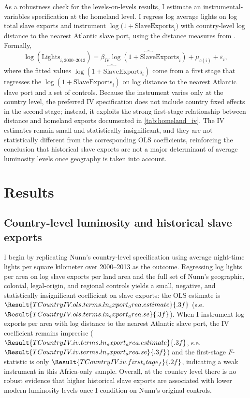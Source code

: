 \documentclass[12pt]{article}
\begin{document}
As a robustness check for the levels-on-levels results, I estimate an instrumental-variables specification at the homeland level. I regress log average lights on log total slave exports and instrument $\log\bigl(1+\text{SlaveExports}_i\bigr)$ with country-level log distance to the nearest Atlantic slave port, using the distance measures from \citet{nunn2008}. Formally,
\begin{equation}
\log\!\left(\text{Lights}_{i,\text{2000--2013}}\right)
=
\beta_{\text{IV}} \widehat{\log\!\left(1+\text{SlaveExports}_i\right)}
+
\mu_{c(i)} + \varepsilon_i,
\label{eq:homeland-iv-levels}
\end{equation}
where the fitted values $\widehat{\log\!\left(1+\text{SlaveExports}_i\right)}$ come from a first stage that regresses the $\log\!\left(1+\text{SlaveExports}_i\right)$ on log distance to the nearest Atlantic slave port and a set of controls. Because the instrument varies only at the country level, the preferred IV specification does not include country fixed effects in the second stage; instead, it exploits the strong first-stage relationship between distance and homeland exports documented in \autoref{tab:homeland_iv}. The IV estimates remain small and statistically insignificant, and they are not statistically different from the corresponding OLS coefficients, reinforcing the conclusion that historical slave exports are not a major determinant of average luminosity levels once geography is taken into account.

\section{Results}
\label{sec:results}

\subsection{Country-level luminosity and historical slave exports}

I begin by replicating Nunn's \citeyearpar{nunn2008} country-level specification using average night-time lights per square kilometer over 2000--2013 as the outcome. Regressing log lights per area on log slave exports per land area and the full set of Nunn's geographic, colonial, legal-origin, and regional controls yields a small, negative, and statistically insignificant coefficient on slave exports: the OLS estimate is $\Result{TCountryIV.ols.terms.ln_export_area.estimate}{.3f}$ (s.e.\ $\Result{TCountryIV.ols.terms.ln_export_area.se}{.3f}$). When I instrument log exports per area with log distance to the nearest Atlantic slave port, the IV coefficient remains imprecise ($\Result{TCountryIV.iv.terms.ln_export_area.estimate}{.3f}$, s.e.\ $\Result{TCountryIV.iv.terms.ln_export_area.se}{.3f}$) and the first-stage $F$-statistic is only $\Result{TCountryIV.iv.first_stage_f}{.2f}$, indicating a weak instrument in this Africa-only sample. Overall, at the country level there is no robust evidence that higher historical slave exports are associated with lower modern luminosity levels once I condition on Nunn's original controls.
\end{document}
